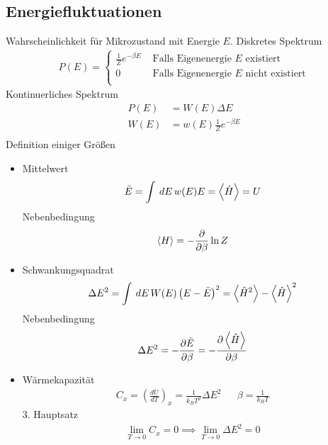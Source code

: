 \documentclass[11pt]{article}
\theoremstyle{plain}
\newcommand{\pd}[2]{\frac{\partial #1 }{\partial #2}}
\renewcommand{\d}[1]{\,d#1\,}
\begin{document}
\subsection*{Energiefluktuationen}
Wahrscheinlichkeit f\"ur Mikrozustand mit Energie $E$.
Diskretes Spektrum 
%
\begin{align*}
  P(E) = 
  \begin{cases}
    \frac{1}{Z} e ^{-\beta E} & \text{ Falls Eigenenergie $E$ existiert} \\
    0                         & \text{ Falls Eigenenergie $E$ nicht existiert} \\
  \end{cases}
  \end{align*}
%
Kontinuerliches Spektrum 
%
\begin{align*}
  P(E) & = W(E) \Delta E \\
  W(E) & = w(E) \frac{1}{Z} e^{-\beta E} \\
\end{align*}
%
Definition einiger Gr\"o\ss{}en
\begin{itemize}
  \item Mittelwert 
    \begin{align*}
      \bar{E} = \int_{}^{} \d{E} w(E) E = \Braket{\hat{H}} = U
    \end{align*}
    Nebenbedingung
    \begin{align*}
      \Braket{H} = -\pd{}{\beta} \ln{Z} 
    \end{align*}
  \item Schwankungsquadrat 
    \begin{align*}
      \Delta E ^2 = \int_{}^{} \d{E} W(E) \left( E- \bar{E} \right) ^2 
      = \Braket{\hat{H}^2} - \Braket{\hat{H}} ^2
    \end{align*}
    Nebenbedingung
    \begin{align*}
      \Delta E^2 = - \pd{\bar{E}}{\beta} = - \pd{\Braket{\hat{H}}}{\beta}
    \end{align*}
  \item W\"armekapazit\"at 
    \begin{align*}
      C_x = \left( \frac{dU}{dT} \right)_x = \frac{1}{k_B T^2} \Delta E^2 &&
      \beta = \frac{1}{k_B T}
    \end{align*}
    3. Hauptsatz
    \begin{align*}
      \lim_{T \to  0} C_x = 0 \implies \lim_{T\to  0 } \Delta E^2 = 0 
    \end{align*}
\end{itemize}
\end{document}
